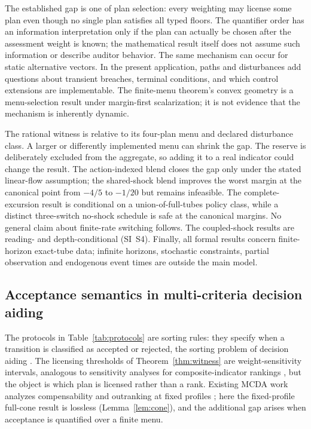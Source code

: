 \documentclass[preprint,11pt,authoryear]{elsarticle}
\theoremstyle{definition}
\theoremstyle{remark}
\begin{document}
The established gap is one of plan selection: every weighting may license some plan even though no single plan satisfies all typed floors. The quantifier order has an information interpretation only if the plan can actually be chosen after the assessment weight is known; the mathematical result itself does not assume such information or describe auditor behavior. The same mechanism can occur for static alternative vectors. In the present application, paths and disturbances add questions about transient breaches, terminal conditions, and which control extensions are implementable. The finite-menu theorem's convex geometry is a menu-selection result under margin-first scalarization; it is not evidence that the mechanism is inherently dynamic.

The rational witness is relative to its four-plan menu and declared disturbance class. A larger or differently implemented menu can shrink the gap. The reserve is deliberately excluded from the aggregate, so adding it to a real indicator could change the result. The action-indexed blend closes the gap only under the stated linear-flow assumption; the shared-shock blend improves the worst margin at the canonical point from $-4/5$ to $-1/20$ but remains infeasible. The complete-excursion result is conditional on a union-of-full-tubes policy class, while a distinct three-switch no-shock schedule is safe at the canonical margins. No general claim about finite-rate switching follows. The coupled-shock results are reading- and depth-conditional (SI~S4). Finally, all formal results concern finite-horizon exact-tube data; infinite horizons, stochastic constraints, partial observation and endogenous event times are outside the main model.

\subsection{Acceptance semantics in multi-criteria decision aiding}\label{sec:mcda}

The protocols in Table~\ref{tab:protocols} are sorting rules: they specify when a transition is classified as accepted or rejected, the sorting problem of decision aiding \citep{Roy1996,Vincke1992}. The licensing thresholds of Theorem~\ref{thm:witness} are weight-sensitivity intervals, analogous to sensitivity analyses for composite-indicator rankings \citep{Nardo2008,Becker2017}, but the object is which plan is licensed rather than a rank. Existing MCDA work analyzes compensability and outranking at fixed profiles \citep{Cinelli2014,Schar2025}; here the fixed-profile full-cone result is lossless (Lemma~\ref{lem:cone}), and the additional gap arises when acceptance is quantified over a finite menu.
\end{document}
